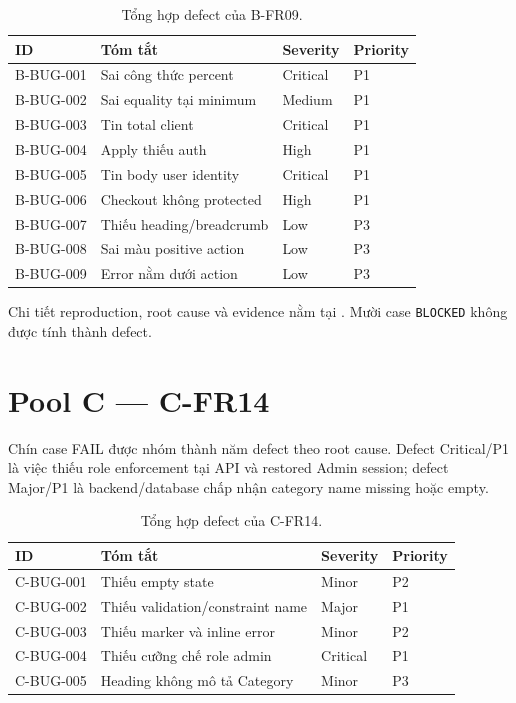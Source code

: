 \begin{table}[H]
  \centering
  \small
  \begin{tabular}{p{}p{}p{}p{}}
    \toprule
    ID & Tóm tắt & Severity & Priority \\
    \midrule
    B-BUG-001 & Sai công thức percent & Critical & P1 \\
    B-BUG-002 & Sai equality tại minimum & Medium & P1 \\
    B-BUG-003 & Tin total client & Critical & P1 \\
    B-BUG-004 & Apply thiếu auth & High & P1 \\
    B-BUG-005 & Tin body user identity & Critical & P1 \\
    B-BUG-006 & Checkout không protected & High & P1 \\
    B-BUG-007 & Thiếu heading/breadcrumb & Low & P3 \\
    B-BUG-008 & Sai màu positive action & Low & P3 \\
    B-BUG-009 & Error nằm dưới action & Low & P3 \\
    \bottomrule
  \end{tabular}
  \caption{Tổng hợp defect của B-FR09.}
\end{table}

Chi tiết reproduction, root cause và evidence nằm tại
. Mười case \texttt{BLOCKED} không được tính
thành defect.

\section{Pool C --- C-FR14}

Chín case FAIL được nhóm thành năm defect theo root cause. Defect Critical/P1 là
việc thiếu role enforcement tại API và restored Admin session; defect Major/P1
là backend/database chấp nhận category name missing hoặc empty.

\begin{table}[H]
  \centering
  \small
  \begin{tabular}{p{}p{}p{}p{}}
    \toprule
    ID & Tóm tắt & Severity & Priority \\
    \midrule
    C-BUG-001 & Thiếu empty state & Minor & P2 \\
    C-BUG-002 & Thiếu validation/constraint name & Major & P1 \\
    C-BUG-003 & Thiếu marker và inline error & Minor & P2 \\
    C-BUG-004 & Thiếu cưỡng chế role admin & Critical & P1 \\
    C-BUG-005 & Heading không mô tả Category & Minor & P3 \\
    \bottomrule
  \end{tabular}
  \caption{Tổng hợp defect của C-FR14.}
\end{table}

